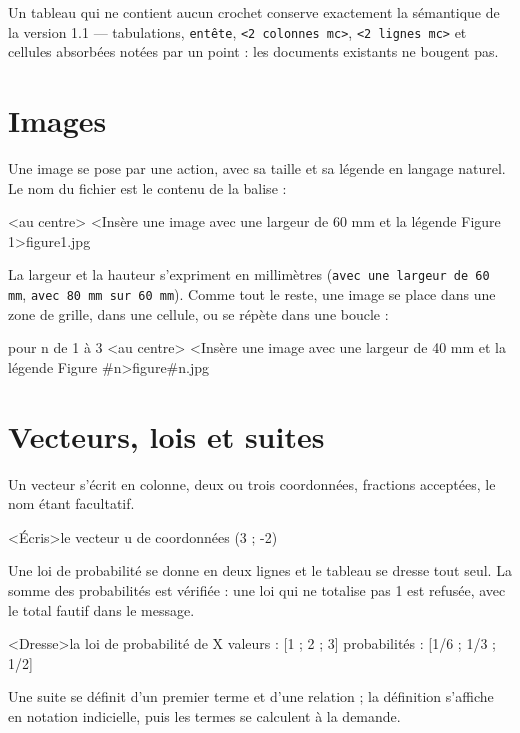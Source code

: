 \documentclass[11pt,a4paper]{article}
\newcommand{\bal}[1]{\texttt{#1}}
\begin{document}
Un tableau qui ne contient aucun crochet conserve exactement la
sémantique de la version 1.1 --- tabulations, \bal{entête},
\bal{<2 colonnes mc>}, \bal{<2 lignes mc>} et cellules absorbées notées
par un point : les documents existants ne bougent pas.

\section{Images}

Une image se pose par une action, avec sa taille et sa légende en
langage naturel. Le nom du fichier est le contenu de la balise :

\begin{code}
<au centre>{
    <Insère une image avec une largeur de 60 mm
        et la légende {Figure 1}>{figure1.jpg}
}
\end{code}

La largeur et la hauteur s'expriment en millimètres
(\bal{avec une largeur de 60 mm}, \bal{avec 80 mm sur 60 mm}). Comme
tout le reste, une image se place dans une zone de grille, dans une
cellule, ou se répète dans une boucle :

\begin{code}
pour n de 1 à 3 {
    <au centre>{
        <Insère une image avec une largeur de 40 mm
            et la légende {Figure #n}>{figure#n.jpg}
    }
}
\end{code}

\section{Vecteurs, lois et suites}

Un vecteur s'écrit en colonne, deux ou trois coordonnées, fractions
acceptées, le nom étant facultatif.

\begin{code}
<Écris>le vecteur u de coordonnées (3 ; -2)
\end{code}

Une loi de probabilité se donne en deux lignes et le tableau se dresse
tout seul. La somme des probabilités est vérifiée : une loi qui ne
totalise pas 1 est refusée, avec le total fautif dans le message.

\begin{code}
<Dresse>la loi de probabilité de X{
    valeurs : [1 ; 2 ; 3]
    probabilités : [1/6 ; 1/3 ; 1/2]
}
\end{code}

Une suite se définit d'un premier terme et d'une relation ; la définition
s'affiche en notation indicielle, puis les termes se calculent à la
demande.
\end{document}
